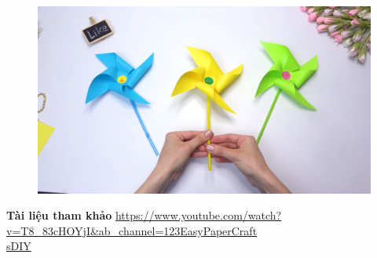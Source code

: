 \begin{multicols}{2}
	\begin{figure}[H]
		\vspace*{-5pt}
		\centering
		\captionsetup{labelformat= empty, justification=centering}
		\includegraphics[width= 0.75\linewidth]{11}
		\vspace*{-10pt}
	\end{figure}
	\textbf{\color{toancuabi}Tài liệu tham khảo}
	\vskip 0.1cm
	\url{https://www.youtube.com/watch?v=T8_83cHOYjI&ab_channel=123EasyPaperCraft}\\
	\url{sDIY}
\end{multicols}
\newpage
\graphicspath{{../toancuabi/pic/}}
\begingroup
{}  
\centering
\endgroup
\vspace*{30pt} 
